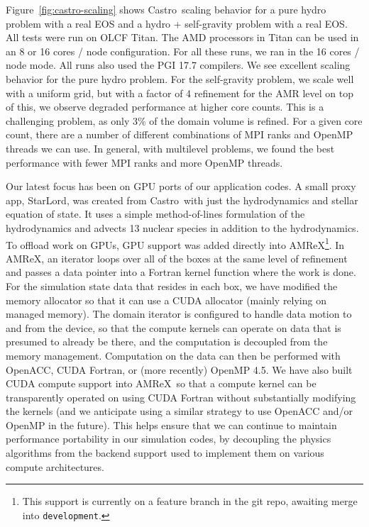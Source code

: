 \documentclass[a4paper]{jpconf}
\newcommand{\castro}{{\sffamily Castro}}
\newcommand{\starlord}{{\sffamily StarLord}}
\newcommand{\amrex}{{\sffamily AMReX}}
\begin{document}
Figure~\ref{fig:castro-scaling} shows \castro\ scaling behavior for a
pure hydro problem with a real EOS and a hydro + self-gravity problem
with a real EOS.  All tests were run on OLCF Titan.  The AMD
processors in Titan can be used in an 8 or 16 cores / node
configuration.  For all these runs, we ran in the 16 cores / node
mode.  All runs also used the PGI 17.7 compilers.  We see excellent
scaling behavior for the pure hydro problem.  For the self-gravity
problem, we scale well with a uniform grid, but with a factor of 4
refinement for the AMR level on top of this, we observe degraded
performance at higher core counts.  This is a challenging problem, as
only 3\% of the domain volume is refined.  For a given core count,
there are a number of different combinations of MPI ranks and OpenMP
threads we can use.  In general, with multilevel problems, we found
the best performance with fewer MPI ranks and more OpenMP threads.

Our latest focus has been on GPU ports of our application codes.  A
small proxy app, \starlord, was created from \castro\ with just the
hydrodynamics and stellar equation of state.  It uses a simple
method-of-lines formulation of the hydrodynamics and advects 13
nuclear species in addition to the hydrodynamics.  To offload work on
GPUs, GPU support was added directly into \amrex\footnote{This support
  is currently on a feature branch in the git repo, awaiting merge
  into {\tt development}.}.  In \amrex, an iterator loops over all of
the boxes at the same level of refinement and passes a data pointer
into a Fortran kernel function where the work is done. For the
simulation state data that resides in each box, we have modified the
memory allocator so that it can use a CUDA allocator (mainly relying on
managed memory).  The domain iterator is configured to handle data
motion to and from the device, so that the compute kernels can operate
on data that is presumed to already be there, and the computation is
decoupled from the memory management. Computation on the data can then
be performed with OpenACC, CUDA Fortran, or (more recently) OpenMP
4.5. We have also built CUDA compute support into \amrex\ so that a
compute kernel can be transparently operated on using CUDA Fortran
without substantially modifying the kernels (and we anticipate using a
similar strategy to use OpenACC and/or OpenMP in the future). This
helps ensure that we can continue to maintain performance portability
in our simulation codes, by decoupling the physics algorithms from the
backend support used to implement them on various compute
architectures.
\end{document}
